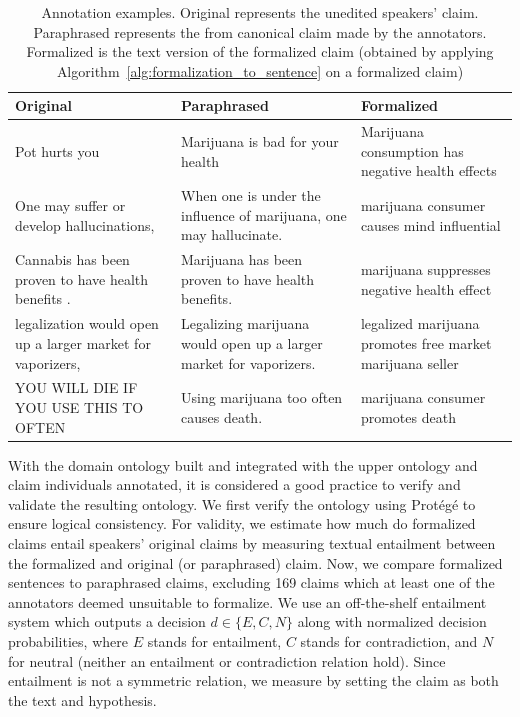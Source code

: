 \begin{table}[t]
	\begin{tabular}{p{5cm}|p{5cm}|p{5cm}}
	\toprule
Original & Paraphrased & Formalized \\
\midrule
Pot hurts you & Marijuana is bad for your health & Marijuana consumption has negative health effects \\

One may suffer or develop hallucinations, &                                                                                            
When one is under the influence of marijuana, one may hallucinate. &       
marijuana consumer causes mind influential \\ 

Cannabis has been proven to have health benefits . & 
Marijuana has been proven to have health benefits. & 
marijuana suppresses negative health effect \\

legalization would open up a larger market for vaporizers, &                                                                                          
Legalizing marijuana would open up a larger market for vaporizers. &                                           
legalized marijuana promotes free market marijuana seller \\

YOU WILL DIE IF YOU USE THIS TO OFTEN &                                                                     
Using marijuana too often causes death. &                                                                                                                                                     
marijuana consumer promotes death \\                                                         
\bottomrule
\end{tabular}
\caption{Annotation examples. Original represents the unedited speakers' claim.
	Paraphrased represents the from canonical claim made by the annotators.
	Formalized is the text version  of the formalized claim (obtained by
	applying Algorithm~\ref{alg:formalization_to_sentence} on a formalized
	claim)
	}
\label{tab:ontology_annotation}
\end{table}

With the domain ontology built and integrated with the upper ontology and claim
individuals annotated, it is considered a good practice to verify and validate
the resulting ontology. 
We first verify the ontology using Prot\'{e}g\'{e} to ensure logical
consistency. For validity, we estimate how much do formalized claims entail 
speakers' original claims by measuring textual entailment between the formalized
and original (or paraphrased) claim. 
Now, we compare formalized sentences to paraphrased claims, excluding 169 claims 
which at least one of the annotators deemed unsuitable to formalize. 
We use an off-the-shelf entailment system which outputs a decision $d \in \{E, C, N\}$
along with normalized decision probabilities, where $E$ stands for entailment, 
$C$ stands for contradiction, and $N$ for neutral (neither an entailment or 
contradiction relation hold). Since entailment is not a symmetric relation, we
measure by setting the claim as both the text and hypothesis. 

